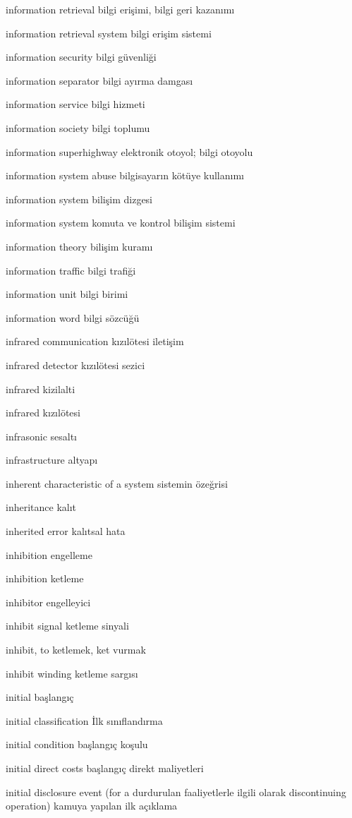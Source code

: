 \documentclass[12pt,fleqn]{article}\usepackage{../../common}
\begin{document}
information retrieval bilgi erişimi, bilgi geri kazanımı

information retrieval system bilgi erişim sistemi

information security bilgi güvenliği

information separator bilgi ayırma damgası

information service bilgi hizmeti

information society bilgi toplumu

information superhighway elektronik otoyol; bilgi otoyolu

information system abuse bilgisayarın kötüye kullanımı

information system bilişim dizgesi

information system komuta ve kontrol bilişim sistemi

information theory bilişim kuramı

information traffic bilgi trafiği

information unit bilgi birimi

information word bilgi sözcüğü

infrared communication kızılötesi iletişim

infrared detector kızılötesi sezici

infrared kizilalti

infrared kızılötesi

infrasonic sesaltı

infrastructure altyapı

inherent characteristic of a system sistemin özeğrisi

inheritance kalıt

inherited error kalıtsal hata

inhibition engelleme

inhibition ketleme

inhibitor engelleyici

inhibit signal ketleme sinyali

inhibit, to ketlemek, ket vurmak

inhibit winding ketleme sargısı

initial başlangıç

initial classification İlk sınıflandırma

initial condition başlangıç koşulu

initial direct costs başlangıç direkt maliyetleri

initial disclosure event (for a durdurulan faaliyetlerle ilgili olarak discontinuing operation) kamuya yapılan ilk açıklama
\end{document}
